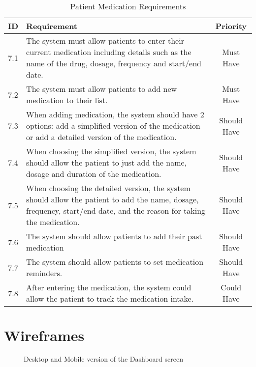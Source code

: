 \begin{table}[h!]
    \centering
    \begin{tabular}{|c|p{10cm}|c|}
    \hline
    \textbf{ID}  & \textbf{Requirement}  & \textbf{Priority} \\ \hline
    7.1  & The system must allow patients to enter their current medication including details such as the name of the drug, dosage, frequency and start/end date. & Must Have \\ \hline
    7.2 & The system must allow patients to add new medication to their list. & Must Have \\ \hline
    7.3 & When adding medication, the system should have 2 options: add a simplified version of the medication or add a detailed version of the medication. & Should Have \\ \hline
    7.4 & When choosing the simplified version, the system should allow the patient to just add the name, dosage and duration of the medication. & Should Have \\ \hline
    7.5 & When choosing the detailed version, the system should allow the patient to add the name, dosage, frequency, start/end date, and the reason for taking the medication. & Should Have \\ \hline
    7.6  & The system should allow patients to add their past medication & Should Have \\ \hline
    7.7  & The system should allow patients to set medication reminders. & Should Have \\ \hline
    7.8 & After entering the medication, the system could allow the patient to track the medication intake. & Could Have \\ \hline

    \end{tabular}
    \caption{Patient Medication Requirements}
\end{table}

\chapter{Wireframes}
\label{sec:wireframes}

\begin{figure}[ht]
    \centering
    \hspace{0.05\textwidth}
    \caption{Desktop and Mobile version of the Dashboard screen}
\end{figure}

